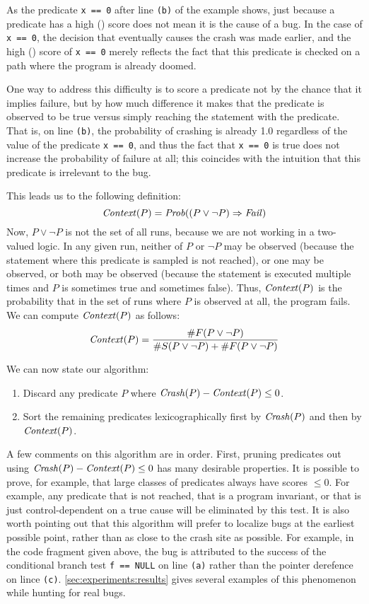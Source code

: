 As the predicate {\tt x == 0} after line {\tt (b)} of the example
shows, just because a predicate has a high \crash() score does not
mean it is the cause of a bug.  In the case of {\tt x == 0}, the
decision that eventually causes the crash was made earlier, and the
high \crash() score of {\tt x == 0} merely reflects the fact that this
predicate is checked on a path where the program is already doomed.

One way to address this difficulty is to score a predicate not by the chance
that it implies failure, but by how much difference it makes that the predicate
is observed to be true versus simply reaching the statement with the predicate.
That is, on line {\tt (b)}, the probability of crashing is already 1.0 regardless
of the value of the predicate {\tt x == 0}, and thus the fact that {\tt x == 0} is
true does not increase the probability of failure at all; this coincides with
the intuition that this predicate is irrelevant to the bug.

This leads us to the following definition:
\[ \mbox{\textit{Context}}(P) = \mbox{\textit{Prob}}((P \vee \neg P) \Rightarrow \mbox{\textit{Fail}}) \]
Now, $P \vee \neg P$ is not the set of all runs, because we are not working in a two-valued logic.
In any given run, neither of $P$ or $\neg P$ may be observed (because the statement where this predicate is
sampled is not reached), or one may be observed, or both may be observed (because the statement is executed
multiple times and $P$ is sometimes true and sometimes false).  Thus, $\mbox{\textit{Context}}(P)$ is the probability that
in the set of runs where $P$ is observed at all, the program fails. We can compute $\mbox{\textit{Context}}(P)$ as follows:
\[ \mbox{\textit{Context}}(P) = \frac{\#F(P \vee \neg P)}{\#S(P \vee \neg P) + \#F(P \vee \neg P)} \]

We can now state our algorithm:
\begin{enumerate}
\item Discard any predicate $P$ where $\mbox{\textit{Crash}}(P) - \mbox{\textit{Context}}(P) \leq 0$.

\item Sort the remaining predicates lexicographically first by $\mbox{\textit{Crash}}(P)$ and then by $\mbox{\textit{Context}}(P)$.
\end{enumerate}

A few comments on this algorithm are in order.  First, pruning
predicates out using $\mbox{\textit{Crash}}(P) - \mbox{\textit{Context}}(P) \leq 0$ has many
desirable properties.  It is possible to prove, for example, that
large classes of predicates always have scores $\leq 0$.  For example,
any predicate that is not reached, that is a program invariant, or
that is just control-dependent on a true cause will be eliminated by
this test.  It is also worth pointing out that this algorithm will
prefer to localize bugs at the earliest possible point, rather than
as close to the crash site as possible.  For example, in the code fragment
given above, the bug is attributed to the success of the conditional branch
test {\tt f == NULL} on line {\tt (a)} rather than the pointer derefence
on lince {\tt (c)}.  \autoref{sec:experiments:results} gives several examples of
this phenomenon while hunting for real bugs.

